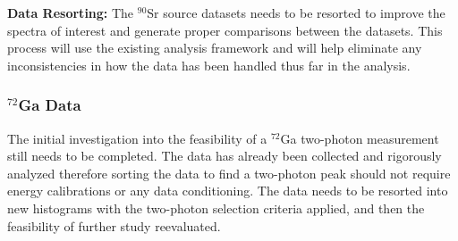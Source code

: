 \documentclass[cnatzke_thesis_proposal.tex]{subfiles}
\begin{document}
\textbf{Data Resorting:} The $^{90}$Sr source datasets needs to be resorted to improve the spectra of interest and generate proper comparisons between the datasets. 
This process will use the existing analysis framework and will help eliminate any inconsistencies in how the data has been handled thus far in the analysis. 

\subsubsection{$^{72}$Ga Data}
The initial investigation into the feasibility of a $^{72}$Ga two-photon measurement still needs to be completed. 
The data has already been collected and rigorously analyzed therefore sorting the data to find a two-photon peak should not require energy calibrations or any data conditioning.
The data needs to be resorted into new histograms with the two-photon selection criteria applied, and then the feasibility of further study reevaluated. 

\end{document}
